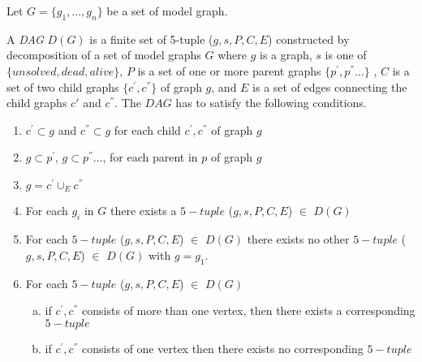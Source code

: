 Let $G=\{g_1 ,\ldots, g_n \}$ be a set of model graph. 
\begin{definition}
A \emph{DAG}  $D(G)$  is a finite set of 5-tuple ($g,s,P,C,E$) constructed by decomposition of a set of model graphs $G$
where $g$ is a graph, $s$ is one of $\{unsolved, dead, alive\}$,  $P$ is a set of one or more parent graphs $\{p^{'},p^{''}\ldots \}$ , $C$ is a set of two child graphs $\{c^{'},c^{''}\}$ of graph $g$, and $E$ 
is a set of edges connecting the child graphs $c{'}$ and $c^{''}$. The $DAG$ has to satisfy the following conditions.


\begin{enumerate}[(1)]
\item  $c^{'}\subset g$ and $c^{''} \subset g$ for each child  $c^{'},c^{''}$ of graph $g$
\item  $g \subset p^{'}$, $g \subset p^{''} \ldots$, for each parent in $p$ of graph $g$
\item $g=c^{'}\cup_{E} c^{''}$
\item For each $g_{i}$ in $G$ there exists a $5-tuple$ ($g,s,P,C,E$) $\in$ $D(G)$ 
\item For each  $5-tuple$ ($g,s,P,C,E$) $\in$ $D(G)$ there exists no other  $5-tuple$ ($g,s,P,C,E$) $\in$ $D(G)$ with $g=g_1$.
\item For each  $5-tuple$ ($g,s,P,C,E$) $\in$ $D(G)$

\begin{enumerate}[a.]
\item if $c^{'},c^{''}$  consists of more than one vertex, then there exists a corresponding  $5-tuple$ 
\item if $c^{'},c^{''}$ consists of one vertex then there exists no corresponding $5-tuple$ 
\end{enumerate}

\end{enumerate}
\end{definition}

